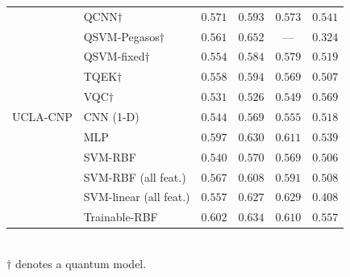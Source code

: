 \begin{table}[t]
\begin{tabular}{|l|l|c|c|c|c|}
\hline
 \multirow{11}{*}{UCLA-CNP} & QCNN$\dagger$ & $0.571$ & $0.593$ & $0.573$ & $0.541$ \\
  & QSVM-Pegasos$\dagger$ & $0.561$ & $0.652$ & --- & $0.324$ \\
  & QSVM-fixed$\dagger$ & $0.554$ & $0.584$ & $0.579$ & $0.519$ \\
  & TQEK$\dagger$ & $0.558$ & $0.594$ & $0.569$ & $0.507$ \\
  & VQC$\dagger$ & $0.531$ & $0.526$ & $0.549$ & $0.569$ \\
  & CNN (1-D) & $0.544$ & $0.569$ & $0.555$ & $0.518$ \\
  & MLP & $0.597$ & $0.630$ & $0.611$ & $0.539$ \\
  & SVM-RBF & $0.540$ & $0.570$ & $0.569$ & $0.506$ \\
  & SVM-RBF (all feat.) & $0.567$ & $0.608$ & $0.591$ & $0.508$ \\
  & SVM-linear (all feat.) & $0.557$ & $0.627$ & $0.629$ & $0.408$ \\
  & Trainable-RBF & $0.602$ & $0.634$ & $0.610$ & $0.557$ \\
\hline
\end{tabular}
\\[2pt]
\footnotesize $\dagger$ denotes a quantum model.
\end{table}
